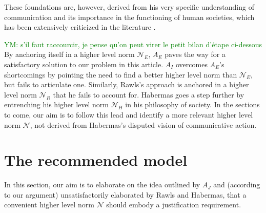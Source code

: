 \documentclass[preprint, french, english, 11pt, authoryear]{elsarticle}%
\newcommand{\ac}[1]{#1}
\newcommand{\commentYM}[1]{\textcolor{green}{YM: #1}}
\newcommand{\adv}{\mathscr{N}}
\begin{document}
These foundations are, however, derived from his very specific understanding of communication and its importance in the functioning of human societies, which has been extensively criticized in the literature \citep{heath_communicative_2001,honneth_kritik_1985,benhabib_situating_1992}. 

\commentYM{s'il faut raccourcir, je pense qu'on peut virer le petit bilan d'étape ci-dessous}
By anchoring itself in a higher level norm $\mathscr{N}_E$, $A_E$ paves the way for a satisfactory solution to our problem in this article. 
$A_I$ overcomes $A_E$'s shortcomings by pointing the need to find a better higher level norm than $\mathscr{N}_E$, but fails to articulate one. Similarly, Rawls's approach is anchored in a higher level norm $\mathscr{N}_{R}$ that he fails to account for. 
Habermas goes a step further by entrenching his higher level norm $\mathscr{N}_{H}$ in his philosophy of society. In the sections to come, our aim is to follow this lead and identify a more relevant higher level norm $\adv$, not derived from Habermas's disputed vision of communicative action. 

\section{The recommended model}
\label{sec:recomm}


In this section, our aim is to elaborate on the idea outlined by $A_J$ and (according to our argument) unsatisfactorily elaborated by Rawls and Habermas, that a convenient higher level norm $\adv$ should embody a justification requirement.
\end{document}
